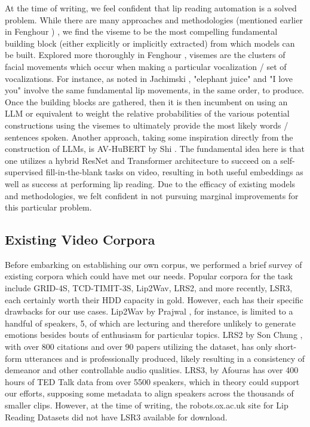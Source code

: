 \documentclass[10pt,twocolumn,letterpaper]{article}
\begin{document}
At the time of writing, we feel confident that lip reading automation is a solved problem. While there are many approaches and methodologies (mentioned earlier in Fenghour  \cite{Fenghour2021}) , we find the viseme to be the most compelling fundamental building block (either explicitly or implicitly extracted) from which models can be built. Explored more thoroughly in Fenghour \cite{Fenghour2023}, visemes are the clusters of facial movements which occur when making a particular vocalization / set of vocalizations. For instance, as noted in Jachimski  \cite{Elephant2017} , "elephant juice" and "I love you" involve the same fundamental lip movements, in the same order, to produce. Once the building blocks are gathered, then it is then incumbent on using an LLM or equivalent to weight the relative probabilities of the various potential constructions using the visemes to ultimately provide the most likely words / sentences spoken. Another approach, taking some inspiration directly from the construction of LLMs, is AV-HuBERT by Shi  \cite{AVHuBert}. The fundamental idea here is that one utilizes a hybrid ResNet and Transformer architecture to succeed on a self-supervised fill-in-the-blank tasks on video, resulting in both useful embeddings as well as success at performing lip reading. Due to the efficacy of existing models and methodologies, we felt confident in not pursuing marginal improvements for this particular problem.

\subsection{Existing Video Corpora}

Before embarking on establishing our own corpus, we performed a brief survey of existing corpora which could have met our needs. Popular corpora for the task include GRID-4S, TCD-TIMIT-3S, Lip2Wav, LRS2, and more recently, LSR3, each certainly worth their HDD capacity in gold. However, each has their specific drawbacks for our use cases. Lip2Wav by Prajwal \cite{LipWavCorpus2020}, for instance, is limited to a handful of speakers, 5, of which are lecturing and therefore unlikely to generate emotions besides bouts of enthusiasm for particular topics.  LRS2 by Son Chung \cite{LipCorpus2017}, with over 800 citations and over 90 papers utilizing the dataset, has only short-form utterances and is professionally produced, likely resulting in a consistency of demeanor and other controllable audio qualities. LRS3, by Afouras \cite{LSR3} has over 400 hours of TED Talk data from over 5500 speakers, which in theory could support our efforts, supposing some metadata to align speakers across the thousands of smaller clips. However, at the time of writing, the robots.ox.ac.uk site for Lip Reading Datasets did not have LSR3 available for download. 
\end{document}
